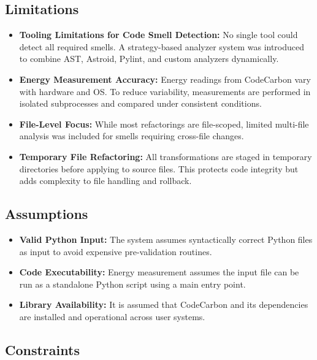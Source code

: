 \documentclass{article}
\begin{document}
\subsection*{Limitations}

\begin{itemize}
    \item \textbf{Tooling Limitations for Code Smell Detection:} No single tool could detect all required smells. A strategy-based analyzer system was introduced to combine AST, Astroid, Pylint, and custom analyzers dynamically.
    
    \item \textbf{Energy Measurement Accuracy:} Energy readings from CodeCarbon vary with hardware and OS. To reduce variability, measurements are performed in isolated subprocesses and compared under consistent conditions.
    
    \item \textbf{File-Level Focus:} While most refactorings are file-scoped, limited multi-file analysis was included for smells requiring cross-file changes. 
    
    \item \textbf{Temporary File Refactoring:} All transformations are staged in temporary directories before applying to source files. This protects code integrity but adds complexity to file handling and rollback.
\end{itemize}

\subsection*{Assumptions}

\begin{itemize}
    \item \textbf{Valid Python Input:} The system assumes syntactically correct Python files as input to avoid expensive pre-validation routines.
    
    \item \textbf{Code Executability:} Energy measurement assumes the input file can be run as a standalone Python script using a main entry point.
    
    \item \textbf{Library Availability:} It is assumed that CodeCarbon and its dependencies are installed and operational across user systems.
\end{itemize}

\subsection*{Constraints}
\end{document}
